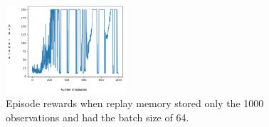 \begin{figure}[H]
    \centering
    \includegraphics[width=0.4\textwidth]{images/experience_replay.png}
    \caption{
    Episode rewards when replay memory stored only the 1000 observations and had the batch size of 64.
    }
    \label{fig:experience_replay}
\end{figure}

